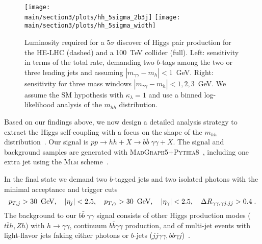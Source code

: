 \begin{figure*}[b!]
\centering 
 \texttt{[image: \\main/section3/plots/hh\_5sigma\_2b3j]} 
 \texttt{[image: \\main/section3/plots/hh\_5sigma\_width]}
   \caption{Luminosity required for a $5\sigma$ discover of Higgs pair
     production for the HE-LHC (dashed) and a 100~TeV collider (full).
     Left: sensitivity in terms of the total rate, demanding two
     $b$-tags among the two or three leading jets and assuming
     $|m_{\gamma\gamma}-m_h|<1$~GeV.  Right: sensitivity for three
     mass windows $|m_{\gamma\gamma}-m_h|<1,2,3$~GeV.  We assume the
     SM hypothesis with $\kappa_\lambda=1$ and use a binned
     log-likelihood analysis of the $m_{hh}$ distribution.}
 \label{fig:bound1}
\end{figure*}

Based on our findings above, we now design a detailed analysis strategy to extract the Higgs
self-coupling with a focus on the shape of the $m_{hh}$
distribution~\cite{Goncalves:2018yva}. Our signal is $pp \to hh + X \to b\bar{b} \; \gamma \gamma + X$.
The signal and background samples are generated with
\textsc{MadGraph5}+\textsc{Pythia8}~\cite{Alwall:2011uj, Alwall:2014hca,Sjostrand:2007gs}, including one
extra jet using the \textsc{Mlm} scheme~\cite{Mangano2002}.\medskip

In the final state we demand two $b$-tagged jets and
two isolated photons with the minimal acceptance and trigger cuts
%
\begin{equation}
p_{T,j}>30~\,\text{Ge\hspace{-.08em}V} , \quad  
|\eta_j |<2.5, \quad 
p_{T,\gamma}>30~\,\text{Ge\hspace{-.08em}V}, \quad  
|\eta_\gamma| <2.5 , \quad 
\Delta R_{\gamma \gamma, \gamma j, jj} >0.4 \; .
\label{eq:base_selections}
\end{equation}
%
The background to our $b\bar{b} \; \gamma \gamma$ signal consists of
other Higgs production modes ($t\bar{t}h, Zh$) with $h \to \gamma
\gamma$, continuum $b\bar{b}\gamma\gamma$ production, and of multi-jet
events with light-flavor jets faking either photons or $b$-jets
($jj\gamma\gamma, b\bar{b}\gamma j$)~\cite{Baur:2003gp}.  

